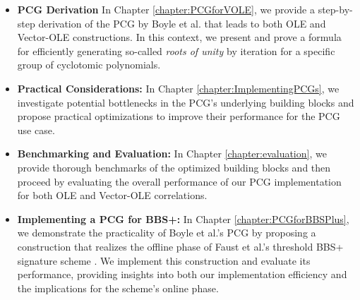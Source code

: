 \begin{itemize}
\item \textbf{PCG Derivation} In Chapter \ref{chapter:PCGforVOLE}, we provide a step-by-step derivation of the PCG by Boyle et al. that leads to both OLE and Vector-OLE constructions. In this context, we present and prove a formula for efficiently generating so-called \textit{roots of unity} by iteration for a specific group of cyclotomic polynomials.
\item \textbf{Practical Considerations:} In Chapter \ref{chapter:ImplementingPCGs}, we investigate potential bottlenecks in the PCG's underlying building blocks and propose practical optimizations to improve their performance for the PCG use case.
\item \textbf{Benchmarking and Evaluation:} In Chapter \ref{chapter:evaluation}, we provide thorough benchmarks of the optimized building blocks and then proceed by evaluating the overall performance of our PCG implementation for both OLE and Vector-OLE correlations.
\item \textbf{Implementing a PCG for BBS+:} In Chapter \ref{chapter:PCGforBBSPlus}, we demonstrate the practicality of Boyle et al.'s PCG by proposing a construction that realizes the offline phase of Faust et al.'s threshold BBS+ signature scheme \cite{faust2023non}. We implement this construction and evaluate its performance, providing insights into both our implementation efficiency and the implications for the scheme's online phase.
\end{itemize}

